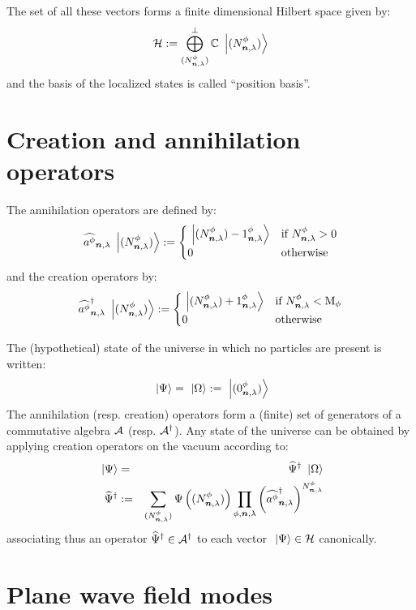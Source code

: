 \documentclass[10pt,a4paper,twoside,openany]{book}
\begin{document}
The set of all these vectors forms a finite dimensional Hilbert space given by:
\begin{equation*}
\mathcal H := \bigoplus^\perp_{({N}^{\phi}_{{\boldsymbol{n}}, {\lambda}})} \mathbb{C} \ \left|{({N}^{\phi}_{{\boldsymbol{n}}, {\lambda}})}\right\rangle
\end{equation*}
and the basis of the localized states is called ``position basis''.

\section{Creation and annihilation operators}

The annihilation operators are defined by:
\begin{equation*}
\widehat{a^{\phi}}_{{\boldsymbol{n}}, {\lambda}} \ \left|{({N}^{\phi}_{{\boldsymbol{n}}, {\lambda}})}\right\rangle := \begin{cases}
\ \left|{({N}^{\phi}_{{\boldsymbol{n}}, {\lambda}}) - {1}^{\phi}_{{\boldsymbol{n}}, {\lambda}}}\right\rangle & \text{if ${N}^{\phi}_{{\boldsymbol{n}}, {\lambda}} > 0$} \\
0 & \text{otherwise}
\end{cases}
\end{equation*}
and the creation operators by:
\begin{equation*}
\widehat{a^{\phi}}^{\dagger}_{{\boldsymbol{n}}, {\lambda}} \ \left|{({N}^{\phi}_{{\boldsymbol{n}}, {\lambda}})}\right\rangle := \begin{cases}
\ \left|{({N}^{\phi}_{{\boldsymbol{n}}, {\lambda}}) + {1}^{\phi}_{{\boldsymbol{n}}, {\lambda}}}\right\rangle & \text{if ${N}^{\phi}_{{\boldsymbol{n}}, {\lambda}} < \mathrm M_{\phi}$} \\
0 & \text{otherwise}
\end{cases}
\end{equation*}

The (hypothetical) state of the universe in which no particles are present is written:
\begin{equation*}
\ \left|{\Psi}\right\rangle = \ \left|{\Omega}\right\rangle := \ \left|{({0}^{\phi}_{{\boldsymbol{n}}, {\lambda}})}\right\rangle
\end{equation*}
The annihilation (resp. creation) operators form a (finite) set of generators of a commutative algebra $\mathcal A$ (resp. $\mathcal A^{\dagger}$). Any state of the universe can be obtained by applying creation operators on the vacuum according to:
\begin{eqnarray*}
\ \left|{\Psi}\right\rangle & = & \widehat{\Psi}^{\dagger} \ \left|{\Omega}\right\rangle \\
\widehat{\Psi}^{\dagger} & := & \sum_{({N}^{\phi}_{{\boldsymbol{n}}, {\lambda}})} \Psi \left(({N}^{\phi}_{{\boldsymbol{n}}, {\lambda}}) \right) \prod_{\phi,\boldsymbol{n},\lambda} \left( \widehat{a^{\phi}}^{\dagger}_{{\boldsymbol{n}}, {\lambda}} \right)^{{N}^{\phi}_{{\boldsymbol{n}}, {\lambda}}}
\end{eqnarray*}
associating thus an operator $\widehat{\Psi}^{\dagger} \in \mathcal A^{\dagger}$ to each vector $\ \left|{\Psi}\right\rangle \in \mathcal H$ canonically.

\section{Plane wave field modes}
\end{document}
